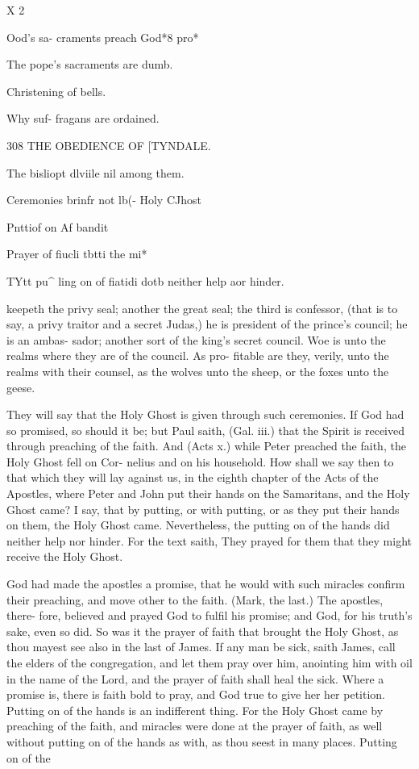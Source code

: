\documentclass{custom}
\begin{document}
{X 2 

Ood's sa- 
craments 
preach 
God*8 pro* 

The pope's 
sacraments 
are dumb. 

Christening 
of bells. 

Why suf- 
fragans are 
ordained. 


308
THE OBEDIENCE OF
[TYNDALE.

The bisliopt 
dlviile nil 
among 
them. 

Ceremonies 
brinfr not 
lb(- Holy 
CJhost 

Pnttiof on 
Af bandit 

Prayer of 
fiucli tbtti 
the mi* 

TYtt pu^ 
ling on of 
fiatidi dotb 
neither 
help aor 
hinder. 

keepeth the privy seal; another the great seal; the third is 
confessor, (that is to say, a privy traitor and a secret Judas,) 
he is president of the prince's council; he is an ambas- 
sador; another sort of the king's secret council. Woe 
is unto the realms where they are of the council. As pro- 
fitable are they, verily, unto the realms with their counsel, 
as the wolves unto the sheep, or the foxes unto the geese. 

They will say that the Holy Ghost is given through 
such ceremonies. If God had so promised, so should it 
be; but Paul saith, (Gal. iii.) that the Spirit is received 
through preaching of the faith. And (Acts x.) while 
Peter preached the faith, the Holy Ghost fell on Cor- 
nelius and on his household. How shall we say then to that 
which they will lay against us, in the eighth chapter of 
the Acts of the Apostles, where Peter and John put their 
hands on the Samaritans, and the Holy Ghost came? I 
say, that by putting, or with putting, or as they put their 
hands on them, the Holy Ghost came. Nevertheless, the 
putting on of the hands did neither help nor hinder. For 
the text saith, They prayed for them that they might receive 
the Holy Ghost. 

God had made the apostles a promise, that he would 
with such miracles confirm their preaching, and move 
other to the faith. (Mark, the last.) The apostles, there- 
fore, believed and prayed God to fulfil his promise; and 
God, for his truth's sake, even so did. So was it the 
prayer of faith that brought the Holy Ghost, as thou 
mayest see also in the last of James. If any man be sick, 
saith James, call the elders of the congregation, and let 
them pray over him, anointing him with oil in the name 
of the Lord, and the prayer of faith shall heal the sick. 
Where a promise is, there is faith bold to pray, and God 
true to give her her petition. Putting on of the hands is 
an indifferent thing. For the Holy Ghost came by 
preaching of the faith, and miracles were done at the 
prayer of faith, as well without putting on of the hands 
as with, as thou seest in many places. Putting on of the 


}
\end{document}
